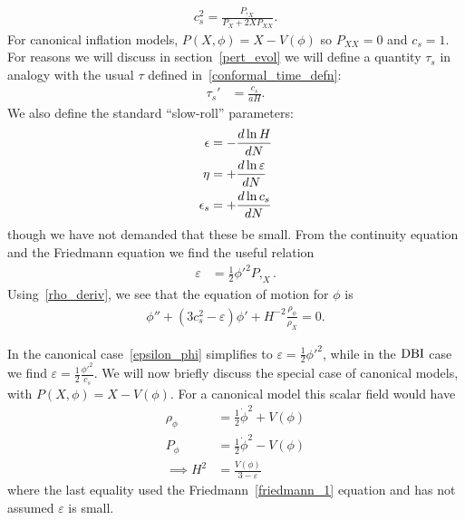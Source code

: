     \begin{align}
        c_s^2 = \frac{P,_X}{P_X+2X P_{XX}}.
    \end{align}
    For canonical inflation models, $P(X,\phi)=X-V(\phi)$
    so $P_{XX}=0$ and $c_s=1$.
    For reasons we will discuss in section~\ref{pert_evol} we will
    define a quantity $\tau_s$
    in analogy with the usual $\tau$ defined in~\eqref{conformal_time_defn}:
    \begin{align}\label{tausdef}
        \tau_s'&=\frac{c_s}{aH}.
    \end{align}
We also define the standard ``slow-roll'' parameters:
\begin{align}\label{slowrollparams}
    \epsilon &= -\frac{d\ln H}{dN}	\\
    \eta &= +\frac{d\ln \varepsilon}{dN}\\
    \epsilon_s &= +\frac{d\ln c_s}{dN}
\end{align}
though we have not demanded that these be small.
From the continuity equation and the Friedmann equation
we find the useful relation
\begin{align}\label{epsilon_phi}
    \varepsilon &= \frac{1}{2}{\phi'}^2 P,_{X}.
\end{align}
Using~\eqref{rho_deriv}, we see that
the equation of motion for $\phi$ is~\cite{Hu_2011}
\begin{align}\label{phieom}
    \phi''+(3c_s^2-\varepsilon)\phi'+H^{-2}\frac{\rho_\phi}{\rho_X}=0.
\end{align}


In the canonical case~\eqref{epsilon_phi} simplifies to
$\varepsilon = \frac{1}{2}{\phi'}^2$,
while in the $\text{DBI}$ case we find
$\varepsilon = \frac{1}{2}\frac{{\phi'}^2}{c_s}$.
We will now briefly discuss the special case of canonical models,
with $P(X,\phi)=X-V(\phi)$.
    For a canonical model this scalar field would have
    \begin{align}
        \rho_\phi &= \frac{1}{2}\dot{\phi}^2+V(\phi)\\
        P_\phi &= \frac{1}{2}\dot{\phi}^2-V(\phi)\\
        \implies H^2 &= \frac{V(\phi)}{3-\varepsilon}
    \end{align}
    where the last equality used the Friedmann~\eqref{friedmann_1} equation and
    has not assumed $\varepsilon$ is small.


